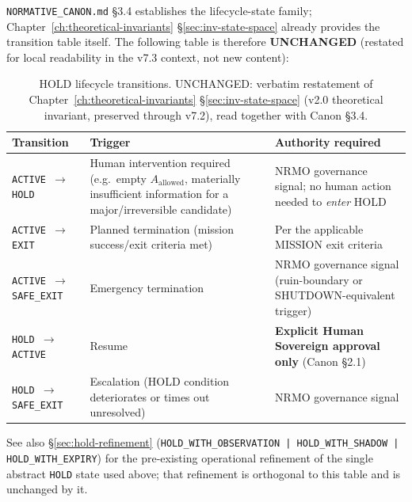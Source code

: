 \texttt{NORMATIVE\_CANON.md} \S3.4 establishes the lifecycle-state
family; Chapter~\ref{ch:theoretical-invariants} \S\ref{sec:inv-state-space}
already provides the transition table itself. The following table is
therefore \textbf{UNCHANGED} (restated for local readability in the
v7.3 context, not new content):

\begin{table}[ht]
\centering
\small
\begin{tabularx}{\linewidth}{lXX}
\toprule
\textbf{Transition} & \textbf{Trigger} & \textbf{Authority required} \\
\midrule
\texttt{ACTIVE $\to$ HOLD} & Human intervention required (e.g.\ empty
$A_{\mathrm{allowed}}$, materially insufficient information for a
major/irreversible candidate) & NRMO governance signal; no human
action needed to \emph{enter} HOLD \\
\texttt{ACTIVE $\to$ EXIT} & Planned termination (mission
success/exit criteria met) & Per the applicable MISSION exit criteria \\
\texttt{ACTIVE $\to$ SAFE\_EXIT} & Emergency termination & NRMO
governance signal (ruin-boundary or SHUTDOWN-equivalent trigger) \\
\texttt{HOLD $\to$ ACTIVE} & Resume & \textbf{Explicit Human Sovereign
approval only} (Canon \S2.1) \\
\texttt{HOLD $\to$ SAFE\_EXIT} & Escalation (HOLD condition
deteriorates or times out unresolved) & NRMO governance signal \\
\bottomrule
\end{tabularx}
\caption[HOLD state machine]{HOLD lifecycle transitions. UNCHANGED:
verbatim restatement of Chapter~\ref{ch:theoretical-invariants}
\S\ref{sec:inv-state-space} (v2.0 theoretical invariant, preserved
through v7.2), read together with Canon \S3.4.}
\label{tab:v73-hold-transitions}
\end{table}

\noindent
See also \S\ref{sec:hold-refinement} (\texttt{HOLD\_WITH\_OBSERVATION
| HOLD\_WITH\_SHADOW | HOLD\_WITH\_EXPIRY}) for the pre-existing
operational refinement of the single abstract \texttt{HOLD} state used
above; that refinement is orthogonal to this table and is unchanged by
it.

